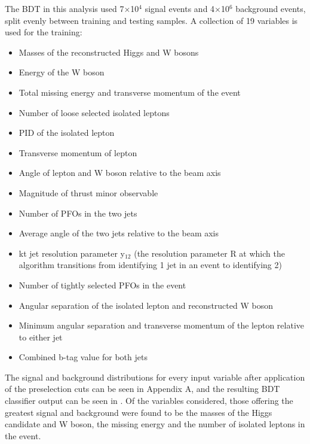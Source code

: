 The \ac{BDT} in this analysis used 7$\times$10$^4$ signal events and 4$\times$10$^6$ background events, split evenly between training and testing samples. A collection of 19 variables is used for the training:

\begin{itemize}
\item Masses of the reconstructed Higgs and W bosons
\item Energy of the W boson
\item Total missing energy and transverse momentum of the event
\item Number of loose selected isolated leptons
\item PID of the isolated lepton
\item Transverse momentum of lepton
\item Angle of lepton and W boson relative to the beam axis
\item Magnitude of thrust minor observable
\item Number of \ac{PFO}s in the two jets
\item Average angle of the two jets relative to the beam axis
\item kt jet resolution parameter y$_{12}$ (the resolution parameter R at which the algorithm transitions from identifying 1 jet in an event to identifying 2)
\item Number of tightly selected PFOs in the event
\item Angular separation of the isolated lepton and reconstructed W boson
\item Minimum angular separation and transverse momentum of the lepton relative to either jet
\item Combined b-tag value for both jets
\end{itemize}

The signal and background distributions for every input variable after application of the preselection cuts can be seen in Appendix A, and the resulting BDT classifier output can be seen in . Of the variables considered, those offering the greatest signal and background were found to be the masses of the Higgs candidate and W boson, the missing energy and the number of isolated leptons in the event.

